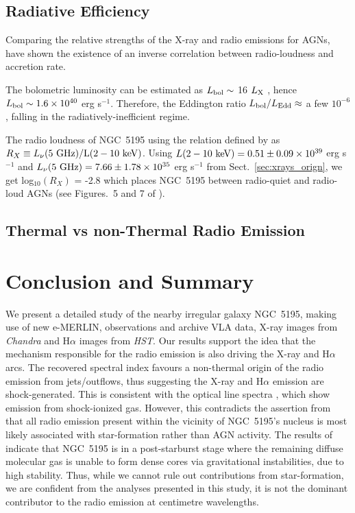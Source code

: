 \documentclass[fleqn,usenatbib]{mnras}
\def\figs{Figures.}
\def\sect{Sect.}
\begin{document}
\subsection{Radiative Efficiency}

Comparing the relative strengths of the X-ray and radio emissions for AGNs, \cite{TW2003, Ho2008} have shown the existence of an inverse correlation between radio-loudness and accretion rate. 


The bolometric luminosity can be estimated as  $L_{\rm {bol}} \sim$ {16} $L_{\rm X}$ 
\citep{Ho2008}, hence $L_{\rm {bol}} \sim 1.6 \times 10^{40}$ 
erg s$^{-1}$. Therefore, the Eddington ratio $L_{\rm{bol}}/L_{\rm{Edd}} \approx$ a few $10^{-6}$, 
falling in the radiatively-inefficient regime.

{The radio loudness of NGC~5195 using the relation defined by \cite{TW2003} as $R_{X} \equiv L_{\nu}(5 ~\rm GHz)/L(2-10~ \rm keV)$. Using  $L(2-10~ \rm keV) = 0.51 \pm 0.09 \times 10^{39}$ erg s$^{-1}$ and $L_{\nu}(5 ~\rm GHz) = 7.66 \pm 1.78 \times 10^{35}$ erg s$^{-1}$ from \sect~\ref{sec:xrays_orign}, we get log$_{10}(R_{X})$ = -2.8 which places NGC~5195 between radio-quiet and radio-loud AGNs (see \figs~5 and 7 of \citealt{Panessaetal2007}).}


\subsection{Thermal vs non-Thermal Radio Emission}



\section{Conclusion and Summary}

We present a detailed study of the nearby irregular galaxy NGC~5195, making use of new e-MERLIN, 
observations and archive VLA data, X-ray images from \textit{Chandra} and H$\alpha$ images from 
\textit{HST}. 
{Our results support the idea that the mechanism responsible for the radio emission is also driving 
the X-ray and H$\alpha$ arcs. The recovered spectral index favours a non-thermal origin of the 
radio emission from jets/outflows, thus suggesting the X-ray and H$\alpha$ emission are shock-generated. This is consistent with 
the optical line spectra \citep{Hoopes-Walterbos}, which show emission from shock-ionized gas. 
However, this contradicts the assertion from \cite{Alataloetal2016} that all radio emission present 
within the vicinity of NGC~5195's nucleus is most likely associated with star-formation rather than AGN 
activity. The results of \cite{Kohnoetal2002} indicate that NGC~5195 is in a post-starburst stage where 
the remaining diffuse molecular gas is unable to form dense cores via gravitational 
instabilities, due to high stability. Thus, while we cannot rule out contributions from star-formation, we are confident from 
the analyses presented in this study, it is not the dominant contributor to the radio emission at 
centimetre wavelengths.} 
\end{document}
